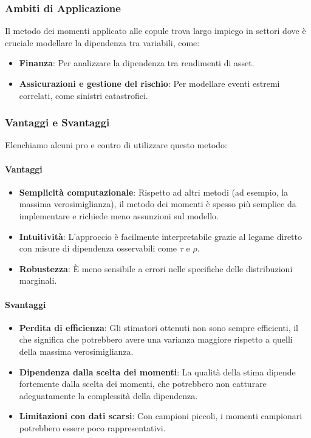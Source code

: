 \documentclass[%
	corpo=11pt,
    twoside,
    stile=classica,
    oldstyle,
    tipotesi=custom,
    greek,
    evenboxes,
]{toptesi}
\begin{document}
\subsubsection{Ambiti di Applicazione}

Il metodo dei momenti applicato alle copule trova largo impiego in settori dove è cruciale modellare la dipendenza tra variabili, come:
\begin{itemize}
	\item \textbf{Finanza}: Per analizzare la dipendenza tra rendimenti di asset.
	\item \textbf{Assicurazioni e gestione del rischio}: Per modellare eventi estremi correlati, come sinistri catastrofici.
\end{itemize}

\subsubsection{Vantaggi e Svantaggi}

Elenchiamo alcuni pro e contro di utilizzare questo metodo:

\paragraph{Vantaggi}
\begin{itemize}
	\item \textbf{Semplicità computazionale}: Rispetto ad altri metodi (ad esempio, la massima verosimiglianza), il metodo dei momenti è spesso più semplice da implementare e richiede meno assunzioni sul modello.
	\item \textbf{Intuitività}: L’approccio è facilmente interpretabile grazie al legame diretto con misure di dipendenza osservabili come \( \tau \) e \( \rho \).
	\item \textbf{Robustezza}: È meno sensibile a errori nelle specifiche delle distribuzioni marginali.
\end{itemize}

\paragraph{Svantaggi}
\begin{itemize}
	\item \textbf{Perdita di efficienza}: Gli stimatori ottenuti non sono sempre efficienti, il che significa che potrebbero avere una varianza maggiore rispetto a quelli della massima verosimiglianza.
	\item \textbf{Dipendenza dalla scelta dei momenti}: La qualità della stima dipende fortemente dalla scelta dei momenti, che potrebbero non catturare adeguatamente la complessità della dipendenza.
	\item \textbf{Limitazioni con dati scarsi}: Con campioni piccoli, i momenti campionari potrebbero essere poco rappresentativi.
\end{itemize}
\end{document}
